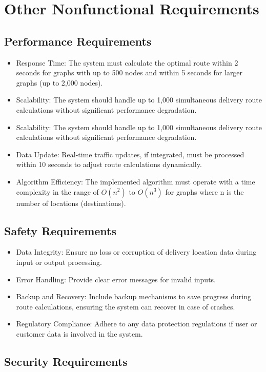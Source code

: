 \section{Other Nonfunctional Requirements}
\subsection{Performance Requirements}

\begin{itemize}
    \item Response Time: The system must calculate the optimal route within 2 seconds for graphs with up to 500 nodes and within 5 seconds for larger graphs (up to 2,000 nodes).
    \item Scalability: The system should handle up to 1,000 simultaneous delivery route calculations without significant performance degradation.
    \item Scalability: The system should handle up to 1,000 simultaneous delivery route calculations without significant performance degradation.
    \item Data Update: Real-time traffic updates, if integrated, must be processed within 10 seconds to adjust route calculations dynamically.
    \item Algorithm Efficiency: The implemented algorithm must operate with a time complexity in the range of \( O(n^2) \) to \( O(n^3) \) for graphs where  n is the number of locations (destinations).
\end{itemize}
\subsection{Safety Requirements}

\begin{itemize}
    \item Data Integrity: Ensure no loss or corruption of delivery location data during input or output processing.
    \item Error Handling: Provide clear error messages for invalid inputs.
    \item Backup and Recovery: Include backup mechanisms to save progress during route calculations, ensuring the system can recover in case of crashes.
    \item Regulatory Compliance: Adhere to any data protection regulations if user or customer data is involved in the system.
\end{itemize}

\subsection{Security Requirements}

